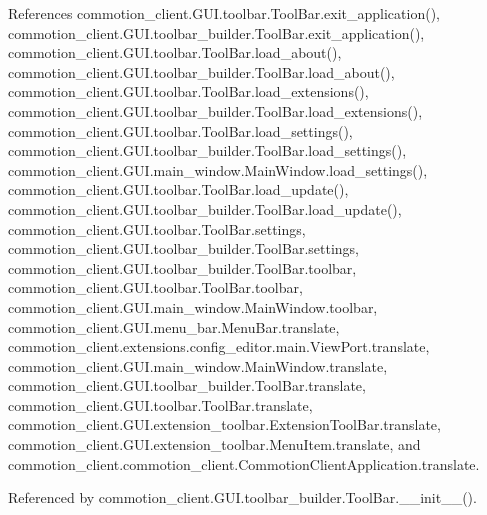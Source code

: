References commotion\+\_\+client.\+G\+U\+I.\+toolbar.\+Tool\+Bar.\+exit\+\_\+application(), commotion\+\_\+client.\+G\+U\+I.\+toolbar\+\_\+builder.\+Tool\+Bar.\+exit\+\_\+application(), commotion\+\_\+client.\+G\+U\+I.\+toolbar.\+Tool\+Bar.\+load\+\_\+about(), commotion\+\_\+client.\+G\+U\+I.\+toolbar\+\_\+builder.\+Tool\+Bar.\+load\+\_\+about(), commotion\+\_\+client.\+G\+U\+I.\+toolbar.\+Tool\+Bar.\+load\+\_\+extensions(), commotion\+\_\+client.\+G\+U\+I.\+toolbar\+\_\+builder.\+Tool\+Bar.\+load\+\_\+extensions(), commotion\+\_\+client.\+G\+U\+I.\+toolbar.\+Tool\+Bar.\+load\+\_\+settings(), commotion\+\_\+client.\+G\+U\+I.\+toolbar\+\_\+builder.\+Tool\+Bar.\+load\+\_\+settings(), commotion\+\_\+client.\+G\+U\+I.\+main\+\_\+window.\+Main\+Window.\+load\+\_\+settings(), commotion\+\_\+client.\+G\+U\+I.\+toolbar.\+Tool\+Bar.\+load\+\_\+update(), commotion\+\_\+client.\+G\+U\+I.\+toolbar\+\_\+builder.\+Tool\+Bar.\+load\+\_\+update(), commotion\+\_\+client.\+G\+U\+I.\+toolbar.\+Tool\+Bar.\+settings, commotion\+\_\+client.\+G\+U\+I.\+toolbar\+\_\+builder.\+Tool\+Bar.\+settings, commotion\+\_\+client.\+G\+U\+I.\+toolbar\+\_\+builder.\+Tool\+Bar.\+toolbar, commotion\+\_\+client.\+G\+U\+I.\+toolbar.\+Tool\+Bar.\+toolbar, commotion\+\_\+client.\+G\+U\+I.\+main\+\_\+window.\+Main\+Window.\+toolbar, commotion\+\_\+client.\+G\+U\+I.\+menu\+\_\+bar.\+Menu\+Bar.\+translate, commotion\+\_\+client.\+extensions.\+config\+\_\+editor.\+main.\+View\+Port.\+translate, commotion\+\_\+client.\+G\+U\+I.\+main\+\_\+window.\+Main\+Window.\+translate, commotion\+\_\+client.\+G\+U\+I.\+toolbar\+\_\+builder.\+Tool\+Bar.\+translate, commotion\+\_\+client.\+G\+U\+I.\+toolbar.\+Tool\+Bar.\+translate, commotion\+\_\+client.\+G\+U\+I.\+extension\+\_\+toolbar.\+Extension\+Tool\+Bar.\+translate, commotion\+\_\+client.\+G\+U\+I.\+extension\+\_\+toolbar.\+Menu\+Item.\+translate, and commotion\+\_\+client.\+commotion\+\_\+client.\+Commotion\+Client\+Application.\+translate.



Referenced by commotion\+\_\+client.\+G\+U\+I.\+toolbar\+\_\+builder.\+Tool\+Bar.\+\_\+\+\_\+init\+\_\+\+\_\+().


